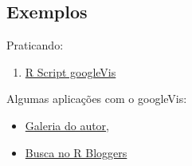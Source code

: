 \subsection*{Exemplos}

\begin{frame}

 Praticando:
  
  \begin{enumerate}
    \itemsep1pt\parskip0pt
  \item
    \href{run:./R/googleVis/googleVis.R}{R Script googleVis}
  \end{enumerate}

  Algumas aplicações com o googleVis:
  \begin{itemize}
    \itemsep1pt\parskip0pt
  \item \href{http://cran.r-project.org/web/packages/googleVis/vignettes/}{Galeria
      do autor},
  \item \href{http://www.r-bloggers.com/?s=googleVis}{Busca no R
      Bloggers}
  \end{itemize}

\end{frame}
